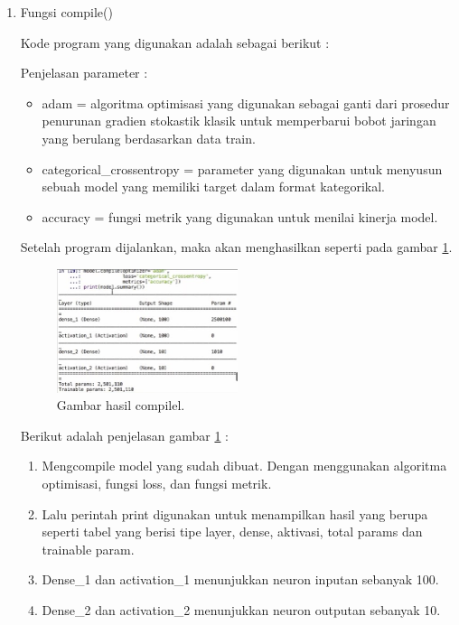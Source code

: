 \begin{enumerate}
\item Fungsi compile()
	\par Kode program yang digunakan adalah sebagai berikut :
	
	\par Penjelasan parameter :
	\begin{itemize}
	\item adam = algoritma optimisasi yang digunakan sebagai ganti dari prosedur penurunan gradien stokastik klasik untuk memperbarui bobot jaringan yang berulang berdasarkan data train.
	\item categorical\_crossentropy = parameter yang digunakan untuk menyusun sebuah model yang memiliki target dalam format kategorikal.
	\item accuracy = fungsi metrik yang digunakan untuk menilai kinerja model.
	\end{itemize}
	
	\par Setelah program dijalankan, maka akan menghasilkan seperti pada gambar \ref{no16}.
	
		\begin{figure}[ht]
		\centerline{\includegraphics[width=0.5\textwidth]{figures/chapter6/no16.jpg}}
		\caption{Gambar hasil compilel.}
		\label{no16}
		\end{figure}
		
	\par Berikut adalah penjelasan gambar \ref{no16} :
	\begin{enumerate}
	\item Mengcompile model yang sudah dibuat. Dengan menggunakan algoritma optimisasi, fungsi loss, dan fungsi metrik.
	\item Lalu perintah print digunakan untuk menampilkan hasil yang berupa seperti tabel yang berisi tipe layer, dense, aktivasi, total params dan trainable param.
	\item Dense\_1 dan activation\_1 menunjukkan neuron inputan sebanyak 100.
	\item Dense\_2 dan activation\_2 menunjukkan neuron outputan sebanyak 10.
	\end{enumerate}


\end{enumerate}
